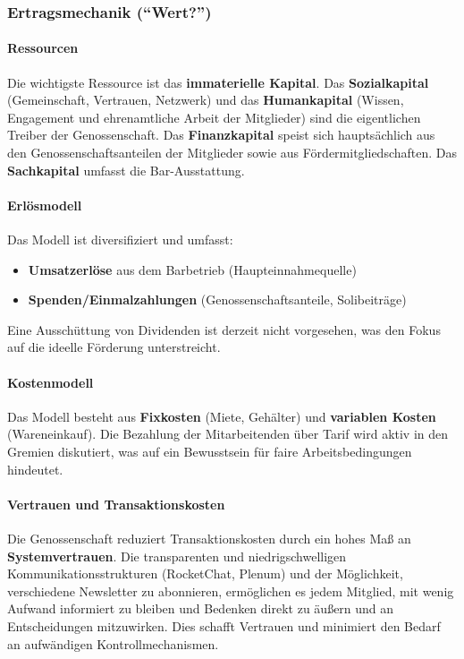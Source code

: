 \subsubsection{Ertragsmechanik (\enquote{Wert?})}

\paragraph{Ressourcen}
Die wichtigste Ressource ist das \textbf{immaterielle Kapital}. Das \textbf{Sozialkapital} (Gemeinschaft, Vertrauen, Netzwerk) und das \textbf{Humankapital} (Wissen, Engagement und ehrenamtliche Arbeit der Mitglieder) sind die eigentlichen Treiber der Genossenschaft. Das \textbf{Finanzkapital} speist sich hauptsächlich aus den Genossenschaftsanteilen der Mitglieder sowie aus Fördermitgliedschaften. Das \textbf{Sachkapital} umfasst die Bar-Ausstattung.

\paragraph{Erlösmodell}
Das Modell ist diversifiziert und umfasst:
\begin{itemize}
\item \textbf{Umsatzerlöse} aus dem Barbetrieb (Haupteinnahmequelle)
\item \textbf{Spenden/Einmalzahlungen} (Genossenschaftsanteile, Solibeiträge)
\end{itemize}

Eine Ausschüttung von Dividenden ist derzeit nicht vorgesehen, was den Fokus auf die ideelle Förderung unterstreicht.

\paragraph{Kostenmodell}
Das Modell besteht aus \textbf{Fixkosten} (Miete, Gehälter) und \textbf{variablen Kosten} (Wareneinkauf). Die Bezahlung der Mitarbeitenden über Tarif wird aktiv in den Gremien diskutiert, was auf ein Bewusstsein für faire Arbeitsbedingungen hindeutet.

\paragraph{Vertrauen und Transaktionskosten}
Die Genossenschaft reduziert Transaktionskosten durch ein hohes Maß an \textbf{Systemvertrauen}. Die transparenten und niedrigschwelligen Kommunikationsstrukturen (RocketChat, Plenum) und der Möglichkeit, verschiedene Newsletter zu abonnieren, ermöglichen es jedem Mitglied, mit wenig Aufwand informiert zu bleiben und Bedenken direkt zu äußern und an Entscheidungen mitzuwirken. Dies schafft Vertrauen und minimiert den Bedarf an aufwändigen Kontrollmechanismen.
